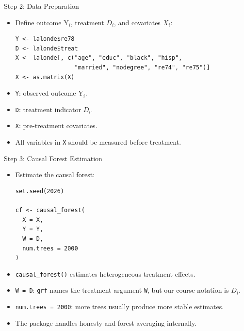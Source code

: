 \documentclass[hyperref={pdfpagelabels=false}]{beamer}
\begin{document}
\begin{frame}[fragile]{Step 2: Data Preparation}
\begin{itemize}
  \item Define outcome $\mathrm{Y}_i$, treatment $D_i$, and covariates $X_i$:
\begin{lstlisting}[style=r-style]
Y <- lalonde$re78
D <- lalonde$treat
X <- lalonde[, c("age", "educ", "black", "hisp",
                 "married", "nodegree", "re74", "re75")]
X <- as.matrix(X)
\end{lstlisting}
  \vspace{0.1cm}
  \item \texttt{Y}: observed outcome $\mathrm{Y}_i$.
  \item \texttt{D}: treatment indicator $D_i$.
  \item \texttt{X}: pre-treatment covariates.
  \item All variables in \texttt{X} should be measured before treatment.
\end{itemize}
\end{frame}

\begin{frame}[fragile]{Step 3: Causal Forest Estimation}
\begin{itemize}
  \item Estimate the causal forest:
\begin{lstlisting}[style=r-style]
set.seed(2026)

cf <- causal_forest(
  X = X,
  Y = Y,
  W = D,
  num.trees = 2000
)
\end{lstlisting}
  \vspace{0.1cm}
  \item \texttt{causal\_forest()} estimates heterogeneous treatment effects.
  \item \texttt{W = D}: \texttt{grf} names the treatment argument \texttt{W}, but our course notation is $D_i$.
  \item \texttt{num.trees = 2000}: more trees usually produce more stable estimates.
  \item The package handles honesty and forest averaging internally.
\end{itemize}
\end{frame}
\end{document}
